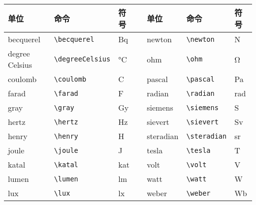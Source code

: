 \begin{table}[htbp]
\centering{}
\label{tab.6e}
\begin{tabular}{lllp{10pt}lll}
\toprule
单位    & 命令  & 符号  &   & 单位    & 命令  & 符号  \\
\midrule
becquerel       & \verb|\becquerel|     & \si{\becquerel}       & & newton      & \verb|\newton|    & \si{\newton} \\
degree Celsius  & \verb|\degreeCelsius| & \si{\degreeCelsius}   & & ohm         & \verb|\ohm|       & \si{\ohm}\\
coulomb         & \verb|\coulomb|       & \si{\coulomb}         & & pascal      & \verb|\pascal|    & \si{\pascal}\\
farad           & \verb|\farad|         & \si{\farad}           & & radian      & \verb|\radian|    & \si{\radian} \\
gray            & \verb|\gray|          & \si{\gray}            & & siemens     & \verb|\siemens|   & \si{\siemens}    \\
hertz           & \verb|\hertz|         & \si{\hertz}           & & sievert     & \verb|\sievert|   & \si{\sievert}\\
henry           & \verb|\henry|         & \si{\henry}           & & steradian   & \verb|\steradian| & \si{\steradian}\\
joule           & \verb|\joule|         & \si{\joule}           & & tesla       & \verb|\tesla|     & \si{\tesla}\\
katal           & \verb|\katal|         & \si{\katal}           & & volt        & \verb|\volt|      & \si{\volt}\\
lumen           & \verb|\lumen|         & \si{\lumen}           & & watt        & \verb|\watt|      & \si{\watt}\\
lux             & \verb|\lux|           & \si{\lux}             & & weber       & \verb|\weber|     & \si{\weber}\\
\bottomrule
\end{tabular}
\end{table}
%
